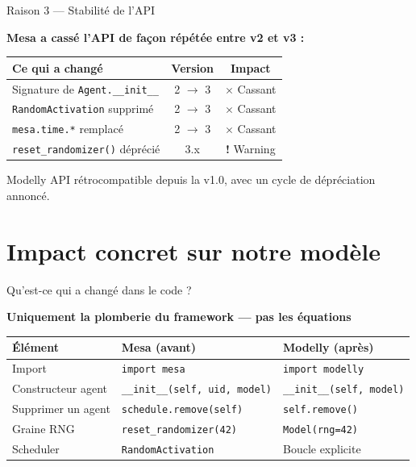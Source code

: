 \documentclass[aspectratio=169, 11pt]{beamer}
\newcommand{\komark}{\textcolor{bad}{\textbf{$\boldsymbol{\times}$}}}
\newcommand{\warnmark}{\textcolor{warncolor}{\textbf{!}}}
\begin{document}
\begin{frame}{Raison \textnumero{}3 — Stabilité de l'API}

  \textbf{Mesa a cassé l'API de façon répétée entre v2 et v3 :}

  \bigskip

  \begin{center}
  \begin{tabular}{lcc}
    \toprule
    Ce qui a changé & Version & Impact \\
    \midrule
    Signature de \texttt{Agent.\_\_init\_\_} & 2 $\to$ 3 & \komark\; Cassant \\
    \texttt{RandomActivation} supprimé & 2 $\to$ 3 & \komark\; Cassant \\
    \texttt{mesa.time.*} remplacé & 2 $\to$ 3 & \komark\; Cassant \\
    \texttt{reset\_randomizer()} déprécié & 3.x & \warnmark\; Warning \\
    \bottomrule
  \end{tabular}
  \end{center}

  \bigskip

  \begin{block}{Modelly}
    API rétrocompatible depuis la v1.0, avec un cycle de dépréciation annoncé.
  \end{block}

\end{frame}

\section{Impact concret sur notre modèle}

\begin{frame}{Qu'est-ce qui a changé dans le code ?}

  \begin{center}
  \textbf{Uniquement la plomberie du framework — pas les équations}
  \end{center}

  \medskip

  \begin{center}
  \begin{tabular}{lll}
    \toprule
    Élément & Mesa (avant) & Modelly (après) \\
    \midrule
    Import & \texttt{import mesa} & \texttt{import modelly} \\
    Constructeur agent & \texttt{\_\_init\_\_(self, uid, model)} & \texttt{\_\_init\_\_(self, model)} \\
    Supprimer un agent & \texttt{schedule.remove(self)} & \texttt{self.remove()} \\
    Graine RNG & \texttt{reset\_randomizer(42)} & \texttt{Model(rng=42)} \\
    Scheduler & \texttt{RandomActivation} & Boucle explicite \\
    \bottomrule
  \end{tabular}
  \end{center}

\end{frame}
\end{document}
